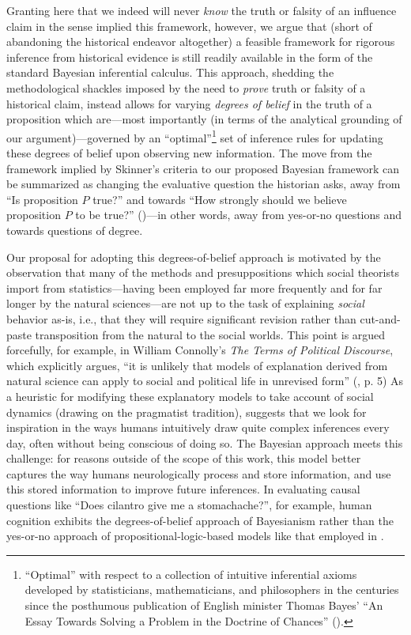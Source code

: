 \documentclass[11pt]{article}
\begin{document}
Granting here that we indeed will never \textit{know} the truth or falsity of an influence claim in the sense implied this framework, however, we argue that (short of abandoning the historical endeavor altogether) a feasible framework for rigorous inference from historical evidence is still readily available in the form of the standard Bayesian inferential calculus. This approach, shedding the methodological shackles imposed by the need to \textit{prove} truth or falsity of a historical claim, instead allows for varying \textit{degrees of belief} in the truth of a proposition which are---most importantly (in terms of the analytical grounding of our argument)---governed by an ``optimal''\footnote{\label{bayesoptimal}``Optimal'' with respect to a collection of intuitive inferential axioms developed by statisticians, mathematicians, and philosophers in the centuries since the posthumous publication of English minister Thomas Bayes' ``An Essay Towards Solving a Problem in the Doctrine of Chances'' (\cite{bayes_essay_1763}).
}
set of inference rules for updating these degrees of belief upon observing new information. The move from the framework implied by Skinner's criteria to our proposed Bayesian framework can be summarized as changing the evaluative question the historian asks, away from ``Is proposition $P$ true?'' and towards ``How strongly should we believe proposition $P$ to be true?'' (\cite{williamson_defence_2010})---in other words, away from yes-or-no questions and towards questions of degree.

Our proposal for adopting this degrees-of-belief approach is motivated by the observation that many of the methods and presuppositions which social theorists import from statistics---having been employed far more frequently and for far longer by the natural sciences---are not up to the task of explaining \textit{social} behavior as-is, i.e., that they will require significant revision rather than cut-and-paste transposition from the natural to the social worlds. This point is argued forcefully, for example, in William Connolly's \textit{The Terms of Political Discourse}, which explicitly argues, ``it is unlikely that models of explanation derived from natural science can apply to social and political life in unrevised form'' (\cite{connolly_terms_1974}, p. 5) As a heuristic for modifying these explanatory models to take account of social dynamics (drawing on the pragmatist tradition), \cite{sokal_fashionable_1997} suggests that we look for inspiration in the ways humans intuitively draw quite complex inferences every day, often without being conscious of doing so. The Bayesian approach meets this challenge: for reasons outside of the scope of this work, this model better captures the way humans neurologically process and store information, and use this stored information to improve future inferences. In evaluating causal questions like ``Does cilantro give me a stomachache?'', for example, human cognition exhibits the degrees-of-belief approach of Bayesianism rather than the yes-or-no approach of propositional-logic-based models like that employed in \cite{skinner_meaning_1969}.
\end{document}
